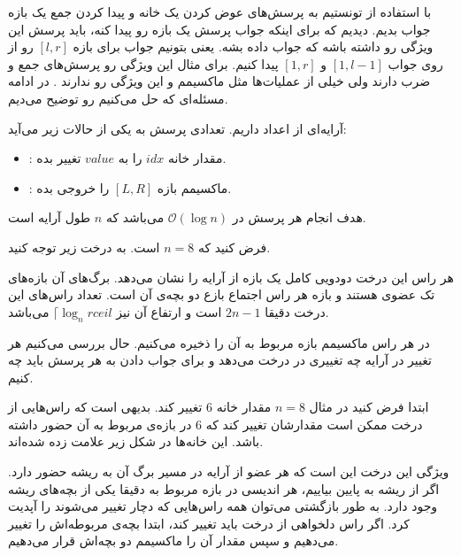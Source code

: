 \def\problemCode{\LR{Segment Tree}}
\def\problemFarsiTitle{درخت بازه‌ای}

\begin{problem}

با استفاده از 
تونستیم به پرسش‌های عوض کردن یک خانه و پیدا کردن جمع یک بازه جواب بدیم.
دیدیم که
برای اینکه جواب پرسش یک بازه رو پیدا کنه، باید پرسش این ویژگی رو داشته باشه که
جواب داده بشه. یعنی بتونیم جواب برای بازه
$[l, r]$
رو از روی جواب 
$[1, l - 1]$
و
$[1, r]$
پیدا کنیم. برای مثال این ویژگی رو پرسش‌های 
جمع و ضرب دارند ولی خیلی از عملیات‌ها مثل ماکسیمم و
این ویژگی رو ندارند
.
در ادامه مسئله‌ای که حل می‌کنیم رو توضیح می‌دیم.

آرایه‌ای از اعداد داریم. تعدادی پرسش به یکی از حالات زیر می‌آید:
\begin{itemize}
  \item 
  :
    مقدار خانه
    $idx$
    را به
    $value$
    تغییر بده.

  \item 
  :
    ماکسیمم بازه
    $[L, R]$
    را خروجی بده.
\end{itemize}
هدف انجام هر پرسش در 
$\mathcal{O}(\log n)$
می‌باشد که 
$n$
طول آرایه است.

فرض کنید که 
$n = 8$
است.
به درخت زیر توجه کنید.

هر راس این درخت دودویی کامل یک بازه از آرایه را نشان می‌دهد. 
برگ‌های آن بازه‌های تک عضوی هستند و 
بازه هر راس اجتماع بازع دو بچه‌ی آن است. 
تعداد راس‌های این درخت دقیقا
$2n - 1$
است و ارتفاع آن نیز
$\lceil \log_n rceil$
می‌باشد.

در هر راس ماکسیمم بازه مربوط به آن را ذخیره می‌کنیم.
حال بررسی می‌کنیم 
هر تغییر در آرایه چه تغییری در درخت می‌دهد و 
برای جواب دادن به هر پرسش باید چه کنیم.

ابتدا فرض کنید در مثال 
$n = 8$
مقدار خانه 
$6$
تغییر کند. بدیهی است که راس‌هایی از درخت ممکن است مقدارشان تغییر کند که 
$6$
در بازه‌ی مربوط به آن حضور داشته باشد.
این خانه‌ها در شکل زیر علامت زده شده‌اند.

ویژگی این درخت این است که هر عضو از آرایه در مسیر برگ آن به ریشه حضور دارد.
اگر از ریشه به پایین بیاییم، 
هر اندیسی در بازه مربوط به دقیقا یکی از بچه‌های ریشه وجود دارد.
به طور بازگشتی می‌توان همه راس‌هایی که دچار تغییر می‌شوند را آپدیت کرد.
اگر راس دلخواهی از درخت باید تغییر کند، ابتدا بچه‌ی مربوطه‌اش را تغییر می‌دهیم و سپس مقدار آن را ماکسیمم دو بچه‌اش قرار می‌دهیم.




\end{problem}
